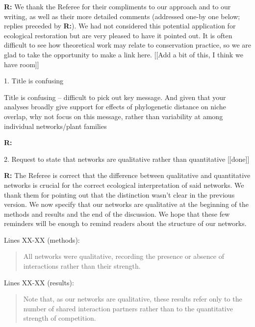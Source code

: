 \documentclass[12pt]{letter}
\newenvironment{refquote}{\bigskip \begin{it}}{\end{it}\smallskip}
\begin{document}
	\textbf{R:} We thank the Referee for their compliments to our approach and to our writing, as well as their more detailed comments (addressed one-by one below; replies preceded by \textbf{R:}). We had not considered this potential application for ecological restoration but are very pleased to have it pointed out. It is often difficult to see how theoretical work may relate to conservation practice, so we are glad to take the opportunity to make a link here. [[Add a bit of this, I think we have room]]

	1. Title is confusing

		\begin{refquote}
			Title is confusing – difficult to pick out key message. And given that your analyses broadly give support for effects of phylogenetic distance on niche overlap, why not focus on this message, rather than variability at among individual networks/plant families
		\end{refquote}


		\textbf{R:} 


	2. Request to state that networks are qualitative rather than quantitative [[done]]

		\textbf{R:} The Referee is correct that the difference between qualitative and quantitative networks is crucial for the correct ecological interpretation of said networks. We thank them for pointing out that the distinction wasn't clear in the previous version. We now specify that our networks are qualitative at the beginning of the methods and results and the end of the discussion. We hope that these few reminders will be enough to remind readers about the structure of our networks.

		Lines XX-XX (methods):

		\begin{quotation}

			All networks were qualitative, recording the presence or 
		    absence of interactions rather than their strength.

		\end{quotation}


		Lines XX-XX (results):
		
		\begin{quotation}

			Note that, as our networks 
		    are qualitative, these results refer only to the number of shared interaction
	    	partners rather than to the quantitative strength of competition.

    	\end{quotation}
\end{document}
